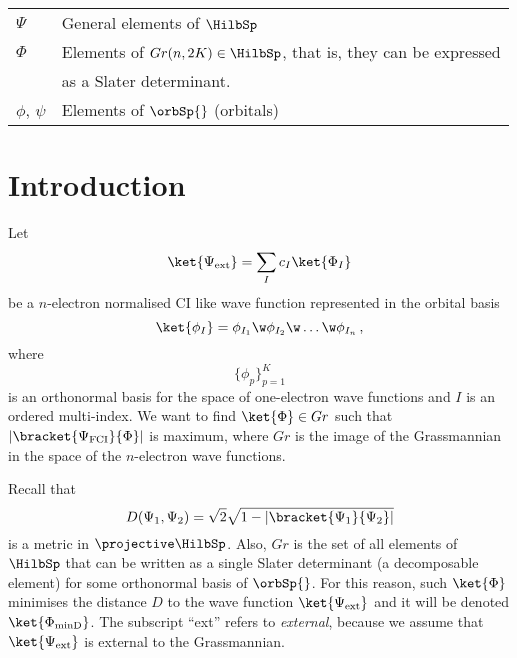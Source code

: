 \documentclass[a4paper,11pt]{article}
\begin{document}
\begin{center}
\begin{tabular}{ll}
    $\Psi$              & General elements of $\HilbSp$                                            \\
    $\Phi$              & Elements of $Gr(n, 2K) \in \HilbSp$, that is, they can be expressed      \\
                        & as a Slater determinant.                                                 \\
    $\phi$, $\psi$      & Elements of $\orbSp{}$ (orbitals)                                        \\
    \hline
  \end{tabular}
\end{center}

\newpage
\section{Introduction}

Let
\begin{equation}\label{eq:ext_wf}
  \ket{\Psi_\text{ext}} = \sum_I c_I \ket{\Phi_I}
\end{equation}
be a $n$-electron normalised CI like wave function represented in the orbital basis
\begin{equation}
  \ket{\phi_I} = \phi_{I_1} \w \phi_{I_2} \w \dots \w \phi_{I_n}\,,
\end{equation}
where
\begin{equation}
  \{\phi_p\}_{p=1}^K
\end{equation}
is an orthonormal basis for the space of one-electron wave functions and $I$ is an ordered multi-index.
We want to find $\ket{\Phi} \in Gr$ such that $|\bracket{\Psi_\text{FCI}}{\Phi}|$ is maximum, where $Gr$ is the image of the Grassmannian in the space of the $n$-electron wave functions.

Recall that
\begin{equation}
  D(\Psi_1, \Psi_2) = \sqrt{2}\sqrt{1 - |\bracket{\Psi_1}{\Psi_2}|}
\end{equation}
is a metric in $\projective \HilbSp$.\cite{}
Also, $Gr$ is the set of all elements of $\HilbSp$ that can be written as a single Slater determinant (a decomposable element) for some orthonormal basis of $\orbSp{}$.
For this reason, such $\ket{\Phi}$ minimises the distance $D$ to the wave function $\ket{\Psi_\text{ext}}$ and it will be denoted $\ket{\Phi_\text{minD}}$.
The subscript ``ext'' refers to \emph{external}, because we assume that $\ket{\Psi_\text{ext}}$ is external to the Grassmannian.
\end{document}
